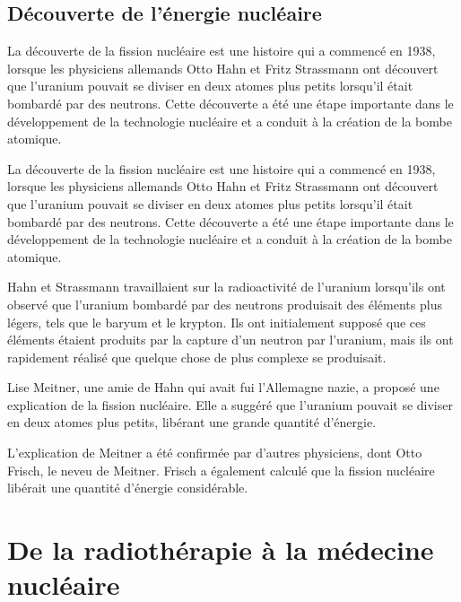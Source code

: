 \subsection{Découverte de l'énergie nucléaire}

La découverte de la fission nucléaire est une histoire qui a commencé en 1938, lorsque les physiciens allemands Otto Hahn et Fritz Strassmann ont découvert que l'uranium pouvait se diviser en deux atomes plus petits lorsqu'il était bombardé par des neutrons. Cette découverte a été une étape importante dans le développement de la technologie nucléaire et a conduit à la création de la bombe atomique.



\begin{rmq}[title=Fission nucléaire expliquée]
La découverte de la fission nucléaire est une histoire qui a commencé en 1938, lorsque les physiciens allemands Otto Hahn et Fritz Strassmann ont découvert que l'uranium pouvait se diviser en deux atomes plus petits lorsqu'il était bombardé par des neutrons. Cette découverte a été une étape importante dans le développement de la technologie nucléaire et a conduit à la création de la bombe atomique.

Hahn et Strassmann travaillaient sur la radioactivité de l'uranium lorsqu'ils ont observé que l'uranium bombardé par des neutrons produisait des éléments plus légers, tels que le baryum et le krypton. Ils ont initialement supposé que ces éléments étaient produits par la capture d'un neutron par l'uranium, mais ils ont rapidement réalisé que quelque chose de plus complexe se produisait.

Lise Meitner, une amie de Hahn qui avait fui l'Allemagne nazie, a proposé une explication de la fission nucléaire. Elle a suggéré que l'uranium pouvait se diviser en deux atomes plus petits, libérant une grande quantité d'énergie.

L'explication de Meitner a été confirmée par d'autres physiciens, dont Otto Frisch, le neveu de Meitner. Frisch a également calculé que la fission nucléaire libérait une quantité d'énergie considérable.
\end{rmq}


\section{De la radiothérapie à la médecine nucléaire}

